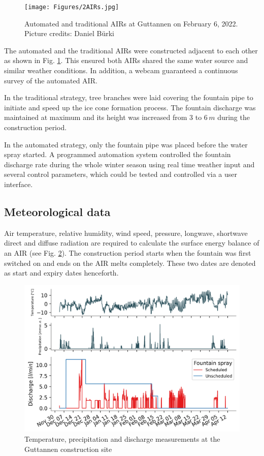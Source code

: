 \documentclass[tc, manuscript]{copernicus}
\begin{document}
\begin{figure}[t]
\texttt{[image: Figures/2AIRs.jpg]}
\caption{Automated and traditional AIRs  at Guttannen on February 6, 2022. Picture credits: Daniel Bürki}
\label{fig:2AIR} 
\end{figure}

The automated and the traditional AIRs were constructed adjacent to each other as shown in Fig. \ref{fig:2AIR}.
This ensured both AIRs shared the same water source and similar weather conditions. In addition, a webcam
guaranteed a continuous survey of the automated AIR.   

In the traditional strategy, tree branches were laid covering the fountain pipe to initiate and speed up the ice
cone formation process. The fountain discharge was maintained at maximum and its height was increased from 3 to
6\,$m$ during the construction period.

In the automated strategy, only the fountain pipe was placed before the water spray started. A programmed
automation system controlled the fountain discharge rate during the whole winter season using real time weather
input and several control parameters, which could be tested and controlled via a user interface. 

\subsection{Meteorological data}

Air temperature, relative humidity, wind speed, pressure, longwave, shortwave direct and diffuse radiation are
required to calculate the surface energy balance of an AIR (see Fig. \ref{fig:aws}). The construction period
starts when the fountain was first switched on and ends on the AIR melts completely. These two dates are denoted
as start and expiry dates henceforth.

\begin{figure}[t]
\includegraphics[width=12cm]{Figures/data.png}
\caption{Temperature, precipitation and discharge measurements at the Guttannen construction site}
\label{fig:aws} 
\end{figure}
\end{document}
